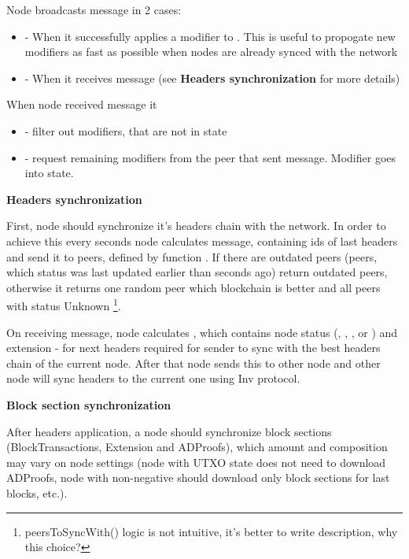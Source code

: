 Node broadcasts  message in 2 cases:
\begin{itemize}
    \item - When it successfully applies a modifier to . This is useful to propogate new modifiers
    as fast as possible when nodes are already synced with the network
    \item - When it receives  message (see \textbf{Headers synchronization} for more details)
\end{itemize}

When node received  message it
\begin{itemize}
    \item - filter out modifiers, that are not in state 
    \item - request remaining modifiers from the peer that sent  message.
    Modifier goes into  state.
\end{itemize}

\textbf{Headers synchronization}

First, node should synchronize it's headers chain with the network.
In order to achieve this every  seconds node calculates  message,
containing ids of last  headers and send it to peers,
defined by function .
If there are outdated peers (peers, which status
was last updated earlier than  seconds ago)  return outdated peers,
otherwise it returns one random peer which blockchain is better and all peers with status Unknown
\footnote{peersToSyncWith() logic is not intuitive, it's better to write description, why this choice?}.

On receiving  message, node calculates ,
which contains node status (, , ,  or ) and extension -
 for next  headers required for  sender to sync with the best headers
chain of the current node.
After that node sends this  to other node and other node will sync headers to the current one
using Inv protocol.

\textbf{Block section synchronization}

After headers application, a node should synchronize block sections
(BlockTransactions, Extension and ADProofs), which amount and composition
may vary on node settings (node with UTXO state does not need to download ADProofs,
node with non-negative 
should download only block sections for last  blocks, etc.).

